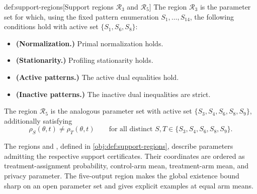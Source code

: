 \begin{definitionv}{def:support-regions}[Support regions $\mathcal R_3$ and $\mathcal R_5$]
The region \(\mathcal R_3\) is the parameter set for which, using the fixed pattern enumeration \(S_1,\ldots,S_{14}\), the following conditions hold with active set \(\{S_1,S_6,S_8\}\):
\begin{itemize}
\item \textbf{(Normalization.)} Primal normalization holds.
\item \textbf{(Stationarity.)} Profiling stationarity holds.
\item \textbf{(Active patterns.)} The active dual equalities hold.
\item \textbf{(Inactive patterns.)} The inactive dual inequalities are strict.
\end{itemize}
The region \(\mathcal R_5\) is the analogous parameter set with active set \(\{S_3,S_4,S_6,S_8,S_9\}\), additionally satisfying
\[
\rho_S(\theta,t)\ne\rho_T(\theta,t)
\qquad
\text{for all distinct }S,T\in\{S_3,S_4,S_6,S_8,S_9\}.
\]
\end{definitionv}

The regions  and , defined in \cref{obj:def:support-regions}, describe parameters admitting the respective support certificates. Their coordinates are ordered as treatment-assignment probability, control-arm mean, treatment-arm mean, and privacy parameter. The five-output region makes the global existence bound sharp on an open parameter set and gives explicit examples at equal arm means.

